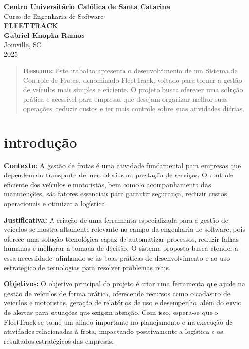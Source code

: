 \documentclass[12pt]{article}
\begin{document}
\begin{titlepage}
\centering

{\Huge \textbf{Centro Universitário Católica de Santa Catarina}}\\[1.5cm]
{\Large Curso de Engenharia de Software}\\[4cm]
{\huge \textbf{FLEETTRACK}}\\[2cm]
{\Large \textbf{Gabriel Knopka Ramos}}\\[6cm]
{\Large Joinville, SC}\\[1.5cm]
{\Large 2025}

\vfill

\end{titlepage}

\newpage

\begin{abstract}
\noindent \textbf{Resumo:} Este trabalho apresenta o desenvolvimento de um Sistema de Controle de Frotas, denominado FleetTrack, voltado para tornar a gestão de veículos mais simples e eficiente. O projeto busca oferecer uma solução prática e acessível para empresas que desejam organizar melhor suas operações, reduzir custos e ter mais controle sobre suas atividades diárias.
\end{abstract}

\vspace{1cm}

\section{introdução}
\noindent \textbf{Contexto:} A gestão de frotas é uma atividade fundamental para empresas que dependem do transporte de mercadorias ou prestação de serviços. O controle eficiente dos veículos e motoristas, bem como o acompanhamento das manutenções, são fatores essenciais para garantir segurança, reduzir custos operacionais e otimizar a logística.

\noindent \textbf{Justificativa:} A criação de uma ferramenta especializada para a gestão de veículos se mostra altamente relevante no campo da engenharia de software, pois oferece uma solução tecnológica capaz de automatizar processos, reduzir falhas humanas e melhorar a tomada de decisão. O sistema proposto busca atender a essa necessidade, alinhando-se às boas práticas de desenvolvimento e ao uso estratégico de tecnologias para resolver problemas reais.

\noindent \textbf{Objetivos:} O objetivo principal do projeto é criar uma ferramenta que ajude na gestão de veículos de forma prática, oferecendo recursos como o cadastro de veículos e motoristas, geração de relatórios de uso e desempenho, além do envio de alertas para situações que exigem atenção. Com isso, espera-se que o FleetTrack se torne um aliado importante no planejamento e na execução de atividades relacionadas à frota, impactando positivamente a logística e os resultados estratégicos das empresas.
\end{document}
